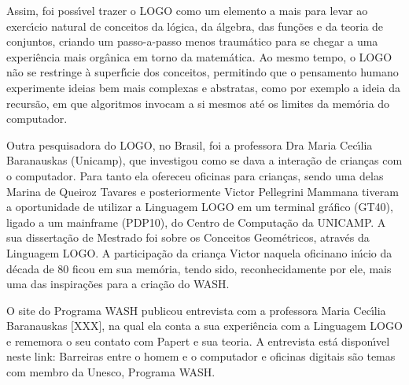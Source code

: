 \documentclass[
12pt,		%
openright,	%
twoside,  %
a4paper,			%
chapter=TITLE,		%
english,			%
french,				%
spanish,			%
brazil				%
]{USPSC-classe/USPSC}
\begin{document}
Assim, foi poss\'{\i}vel trazer o LOGO como um elemento a mais para levar ao exerc\'{\i}cio natural de conceitos da l\'ogica, da \'algebra, das fun\c{c}\~oes e da teoria de conjuntos, criando um passo-a-passo menos traum\'atico para se chegar a uma experi\^encia mais org\^anica em torno da matem\'atica. Ao mesmo tempo, o LOGO n\~ao se restringe \`a superf\'{\i}cie dos conceitos, permitindo que o pensamento humano experimente ideias bem mais complexas e abstratas, como por exemplo a ideia da recurs\~ao, em que algoritmos invocam a si mesmos at\'e os limites da mem\'oria do computador.

















Outra pesquisadora do LOGO, no Brasil, foi a professora  Dra Maria Cec\'{\i}lia Baranauskas (Unicamp), que investigou como  se dava a intera\c{c}\~ao de crian\c{c}as com o computador. Para tanto ela ofereceu oficinas para  crian\c{c}as, sendo uma delas Marina de Queiroz Tavares  e posteriormente Victor Pellegrini Mammana  tiveram a oportunidade  de  utilizar a Linguagem LOGO em um terminal gr\'afico (GT40), ligado a um mainframe (PDP10), do Centro de Computa\c{c}\~ao da UNICAMP. A sua disserta\c{c}\~ao de Mestrado foi sobre os \textquotedbl Conceitos Geom\'etricos, atrav\'es da Linguagem LOGO\textquotedbl . A participa\c{c}\~ao da crian\c{c}a Victor naquela \textquotedbl oficina\textquotedbl  no in\'{\i}cio da d\'ecada de 80 ficou em sua mem\'oria, tendo sido, reconhecidamente por ele, mais uma das inspira\c{c}\~oes para a cria\c{c}\~ao do WASH.

















O site do Programa WASH publicou entrevista com a professora Maria Cec\'{\i}lia Baranauskas [XXX], na qual ela conta a sua experi\^encia com a Linguagem LOGO e rememora o seu contato com Papert e sua teoria. A entrevista est\'a dispon\'{\i}vel neste link: \textquotedbl Barreiras entre o homem e o computador e oficinas digitais s\~ao temas com membro da Unesco, Programa WASH\textquotedbl .
\end{document}
